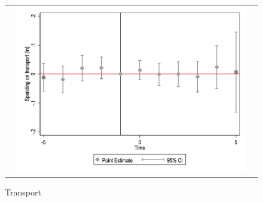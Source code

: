 \begin{figure}[ht]
\begin{tabular}{@{}ccc@{}}
\begin{minipage}[t]{0.32\textwidth}
            \label{fig:cassport}
        \end{minipage} &
        \begin{minipage}[t]{0.32\textwidth}
            \centering
            \caption{Transport}
            \includegraphics[width=\linewidth]{images/pop_10000/caseventdd_ln_q4_08_step1.jpg}
            \label{fig:castransport}
        \end{minipage} \\[10pt]


\end{tabular}
\end{figure}
